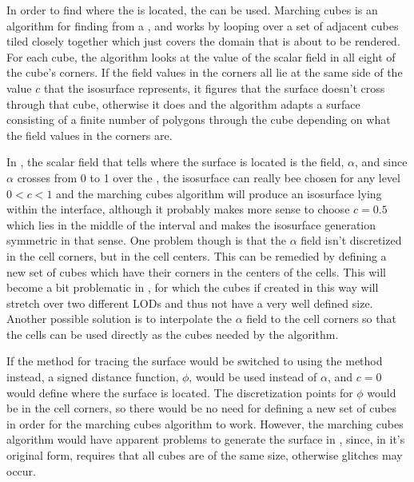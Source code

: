 In order to find where the  is located, the   can be used. Marching cubes is an algorithm for finding \isosurfaces from a , and works by looping over a set of adjacent cubes tiled closely together which just covers the domain that is about to be rendered. For each cube, the algorithm looks at the value of the scalar field in all eight of the cube's corners. If the field values in the corners all lie at the same side of the value $c$ that the isosurface represents, it figures that the surface doesn't cross through that cube, otherwise it does and the algorithm adapts a surface consisting of a finite number of polygons through the cube depending on what the field values in the corners are.

In \thisprojectwork, the scalar field that tells where the surface is located is the  {field}, $\alpha$, and since $\alpha$ crosses from 0 to 1 over the \interface, the isosurface can really bee chosen for any level $0 < c < 1$ and the marching cubes algorithm will produce an isosurface lying within the interface, although it probably makes more sense to choose $c = 0.5$ which lies in the middle of the interval and makes the isosurface generation symmetric in that sense. One problem though is that the $\alpha$ field isn't discretized in the cell corners, but in the cell centers. This can be remedied by defining a new set of cubes which have their corners in the centers of the cells. This will become a bit problematic in , for which the cubes if created in this way will stretch over two different LODs and thus not have a very well defined size. Another possible solution is to interpolate the $\alpha$ field to the cell corners so that the cells can be used directly as the cubes needed by the algorithm.

If the \VOF method for tracing the surface would be switched to using the \LS method instead, a signed distance function, $\phi$, would be used instead of $\alpha$, and $c = 0$ would define where the surface is located. The discretization points for $\phi$ would be in the cell corners, so there would be no need for defining a new set of cubes in order for the marching cubes algorithm to work. However, the marching cubes algorithm would have apparent problems to generate the surface in , since, in it's original form, requires that all cubes are of the same size, otherwise glitches may occur.

